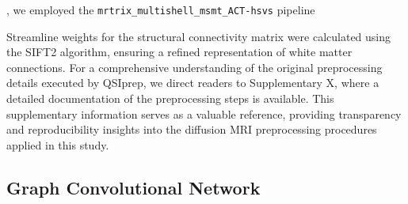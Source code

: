 \documentclass{cys}
\begin{document}
, we employed the \texttt{mrtrix\_multishell\_msmt\_ACT-hsvs} pipeline

\bigskip
Streamline weights for the structural connectivity matrix were calculated using the SIFT2 algorithm, ensuring a refined representation of white matter connections. For a comprehensive understanding of the original preprocessing details executed by QSIprep, we direct readers to Supplementary X, where a detailed documentation of the preprocessing steps is available. This supplementary information serves as a valuable reference, providing transparency and reproducibility insights into the diffusion MRI preprocessing procedures applied in this study.






\subsection{Graph Convolutional Network}
\label{subsection:GCN}



\end{document}
